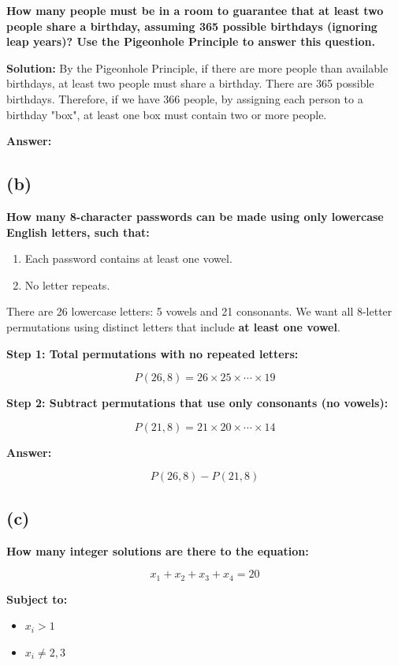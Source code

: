 \documentclass{article}
\begin{document}
\textbf{How many people must be in a room to guarantee that at least two people share a birthday, assuming 365 possible birthdays (ignoring leap years)? Use the Pigeonhole Principle to answer this question.}

\textbf{Solution:}  
By the Pigeonhole Principle, if there are more people than available birthdays, at least two people must share a birthday.  
There are 365 possible birthdays.  
Therefore, if we have 366 people, by assigning each person to a birthday "box", at least one box must contain two or more people.

\textbf{Answer:} 

\subsection*{(b)}

\textbf{How many 8-character passwords can be made using only lowercase English letters, such that:}

\begin{enumerate}[label=\roman*.]
  \item Each password contains at least one vowel.
  \item No letter repeats.
\end{enumerate}

There are 26 lowercase letters: 5 vowels and 21 consonants.  
We want all 8-letter permutations using distinct letters that include \textbf{at least one vowel}.

\textbf{Step 1: Total permutations with no repeated letters:}

\[
P(26, 8) = 26 \times 25 \times \cdots \times 19
\]

\textbf{Step 2: Subtract permutations that use only consonants (no vowels):}

\[
P(21, 8) = 21 \times 20 \times \cdots \times 14
\]

\textbf{Answer:}

\[
\boxed{P(26, 8) - P(21, 8)}
\]

\subsection*{(c)}

\textbf{How many integer solutions are there to the equation:}

\[
x_1 + x_2 + x_3 + x_4 = 20
\]

\textbf{Subject to:}
\begin{itemize}
  \item \(x_i > 1\)
  \item \(x_i \ne 2, 3\)
\end{itemize}
\end{document}
